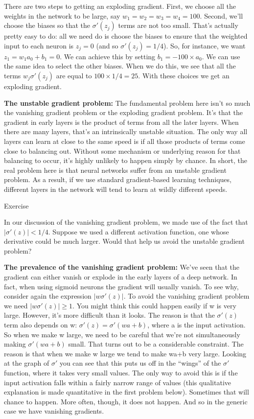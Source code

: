 \documentclass[a4paper,twoside,10pt]{book}
\begin{document}
There are two steps to getting an exploding gradient. First, we choose all the weights in the network to be large, say $w_1=w_2=w_3=w_4=100$. Second, we'll choose the biases so that the $\sigma'(z_j)$ terms are not too small. That's actually pretty easy to do: all we need do is choose the biases to ensure that the weighted input to each neuron is $z_j=0$ (and so $\sigma'(z_j)=1/4$). So, for instance, we want $z_1=w_1a_0+b_1=0$. We can achieve this by setting $b_1=-100\times a_0$. We can use the same idea to select the other biases. When we do this, we see that all the terms $w_j\sigma'(z_j)$ are equal to $100\times1/4=25$. With these choices we get an exploding gradient.

\textbf{The unstable gradient problem:} The fundamental problem here isn't so much the vanishing gradient problem or the exploding gradient problem. It's that the gradient in early layers is the product of terms from all the later layers. When there are many layers, that's an intrinsically unstable situation. The only way all layers can learn at close to the same speed is if all those products of terms come close to balancing out. Without some mechanism or underlying reason for that balancing to occur, it's highly unlikely to happen simply by chance. In short, the real problem here is that neural networks suffer from an unstable gradient problem. As a result, if we use standard gradient-based learning techniques, different layers in the network will tend to learn at wildly different speeds.

\begin{exercize}{Exercise}
\item In our discussion of the vanishing gradient problem, we made use of the fact that $|\sigma'(z)|<1/4$. Suppose we used a different activation function, one whose derivative could be much larger. Would that help us avoid the unstable gradient problem?
\end{exercize}
\textbf{The prevalence of the vanishing gradient problem:} We've seen that the gradient can either vanish or explode in the early layers of a deep network. In fact, when using sigmoid neurons the gradient will usually vanish. To see why, consider again the expression $|w\sigma'(z)|$. To avoid the vanishing gradient problem we need $|w\sigma'(z)|\geq1$. You might think this could happen easily if w is very large. However, it's more difficult than it looks. The reason is that the $\sigma'(z)$ term also depends on w: $\sigma'(z)=\sigma'(wa+b)$, where a is the input activation. So when we make w large, we need to be careful that we're not simultaneously making $\sigma'(wa+b)$ small. That turns out to be a considerable constraint. The reason is that when we make w large we tend to make wa+b very large. Looking at the graph of $\sigma'$ you can see that this puts us off in the ``wings'' of the $\sigma'$ function, where it takes very small values. The only way to avoid this is if the input activation falls within a fairly narrow range of values (this qualitative explanation is made quantitative in the first problem below). Sometimes that will chance to happen. More often, though, it does not happen. And so in the generic case we have vanishing gradients.
\end{document}
